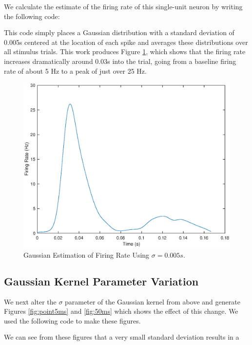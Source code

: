 \documentclass[11pt, oneside]{article}
\begin{document}
We calculate the estimate of the firing rate of this single-unit neuron by writing the following code:

This code simply places a Gaussian distribution with a standard deviation of 0.005s centered at the location of each spike and averages these distributions over all stimulus trials. This work produces Figure \ref{fig:Gaussian}, which shows that the firing rate increases dramatically around 0.03s into the trial, going from a baseline firing rate of about 5 Hz to a peak of just over 25 Hz.

\begin{figure}[ht!]
\includegraphics[width=1\textwidth]{fivemillisecondplot.eps}
\caption{Gaussian Estimation of Firing Rate Using $\sigma = 0.005s$.}
\label{fig:Gaussian}
\end{figure}

\subsection{Gaussian Kernel Parameter Variation}

We next alter the $\sigma$ parameter of the Gaussian kernel from above and generate Figures \ref{fig:point5ms} and \ref{fig:50ms} which shows the effect of this change. We used the following code to make these figures.

We can see from these figures that a very small standard deviation results in a
\end{document}
